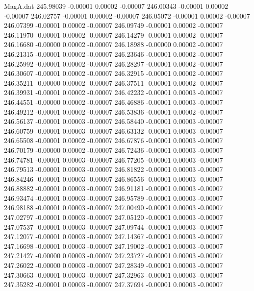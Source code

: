 \begin{filecontents}{MagA.dat}
 245.98039   -0.00001    0.00002   -0.00007
 246.00343   -0.00001    0.00002   -0.00007
 246.02757   -0.00001    0.00002   -0.00007
 246.05072   -0.00001    0.00002   -0.00007
 246.07399   -0.00001    0.00002   -0.00007
 246.09749   -0.00001    0.00002   -0.00007
 246.11970   -0.00001    0.00002   -0.00007
 246.14279   -0.00001    0.00002   -0.00007
 246.16680   -0.00000    0.00002   -0.00007
 246.18988   -0.00000    0.00002   -0.00007
 246.21315   -0.00001    0.00002   -0.00007
 246.23646   -0.00001    0.00002   -0.00007
 246.25992   -0.00001    0.00002   -0.00007
 246.28297   -0.00001    0.00002   -0.00007
 246.30607   -0.00001    0.00002   -0.00007
 246.32915   -0.00001    0.00002   -0.00007
 246.35211   -0.00000    0.00002   -0.00007
 246.37511   -0.00001    0.00002   -0.00007
 246.39931   -0.00001    0.00002   -0.00007
 246.42232   -0.00001    0.00003   -0.00007
 246.44551   -0.00000    0.00002   -0.00007
 246.46886   -0.00001    0.00003   -0.00007
 246.49212   -0.00001    0.00002   -0.00007
 246.53836   -0.00001    0.00002   -0.00007
 246.56137   -0.00001    0.00003   -0.00007
 246.58440   -0.00001    0.00003   -0.00007
 246.60759   -0.00001    0.00003   -0.00007
 246.63132   -0.00001    0.00003   -0.00007
 246.65508   -0.00001    0.00002   -0.00007
 246.67876   -0.00001    0.00003   -0.00007
 246.70179   -0.00000    0.00002   -0.00007
 246.72436   -0.00001    0.00003   -0.00007
 246.74781   -0.00001    0.00003   -0.00007
 246.77205   -0.00001    0.00003   -0.00007
 246.79513   -0.00001    0.00003   -0.00007
 246.81822   -0.00001    0.00003   -0.00007
 246.84246   -0.00001    0.00003   -0.00007
 246.86556   -0.00001    0.00003   -0.00007
 246.88882   -0.00001    0.00003   -0.00007
 246.91181   -0.00001    0.00003   -0.00007
 246.93474   -0.00001    0.00003   -0.00007
 246.95789   -0.00001    0.00003   -0.00007
 246.98188   -0.00001    0.00003   -0.00007
 247.00490   -0.00001    0.00003   -0.00007
 247.02797   -0.00001    0.00003   -0.00007
 247.05120   -0.00001    0.00003   -0.00007
 247.07537   -0.00001    0.00003   -0.00007
 247.09744   -0.00001    0.00003   -0.00007
 247.12077   -0.00001    0.00003   -0.00007
 247.14367   -0.00001    0.00003   -0.00007
 247.16698   -0.00001    0.00003   -0.00007
 247.19002   -0.00001    0.00003   -0.00007
 247.21427   -0.00000    0.00003   -0.00007
 247.23727   -0.00001    0.00003   -0.00007
 247.26022   -0.00000    0.00003   -0.00007
 247.28349   -0.00001    0.00003   -0.00007
 247.30663   -0.00001    0.00003   -0.00007
 247.32963   -0.00001    0.00003   -0.00007
 247.35282   -0.00001    0.00003   -0.00007
 247.37694   -0.00001    0.00003   -0.00007

\end{filecontents}
